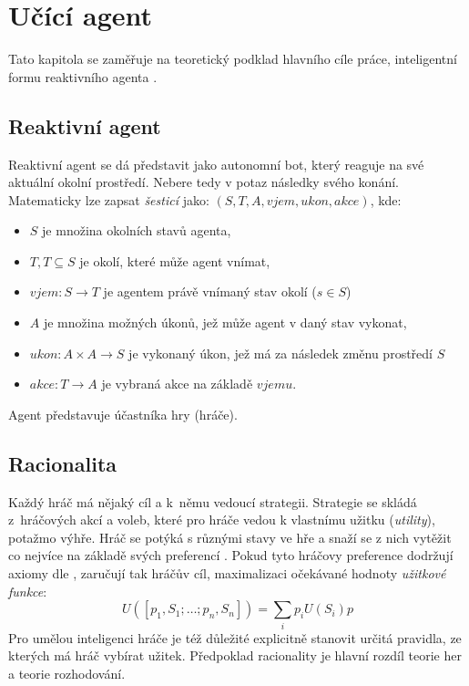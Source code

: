 \chapter{Učící agent}
Tato kapitola se zaměřuje na teoretický podklad hlavního cíle práce, inteligentní formu reaktivního agenta \cite{AI3}.
\section{Reaktivní agent}
Reaktivní agent \cite{AI3} se dá představit jako autonomní bot, který reaguje na své aktuální okolní prostředí. Nebere tedy v potaz následky svého konání. Matematicky lze zapsat \textit{šesticí} \cite{AI3} jako: $(S,T,A, vjem, ukon, akce)$, kde:
\begin{itemize}
\item $S$ je množina okolních stavů agenta,
\item $T, T\subseteq S$ je okolí, které může agent vnímat,
\item $vjem: S \to T$ je agentem právě vnímaný stav okolí ($s \in S$)
\item $A$ je množina možných úkonů, jež může agent v daný stav vykonat,
\item $ukon: A \times A \to S$ je vykonaný úkon, jež má za následek změnu prostředí $S$
\item $akce: T \to A$ je vybraná akce na základě $vjemu$.
\end{itemize}
Agent představuje účastníka hry (hráče).

\section{Racionalita}
\label{sec:racionalita}
Každý hráč má nějaký cíl a k němu vedoucí strategii. Strategie se skládá z hráčových akcí a voleb, které pro hráče vedou k vlastnímu užitku (\textit{utility}), potažmo výhře. Hráč se potýká s různými stavy ve hře a snaží se z nich vytěžit co nejvíce na základě svých preferencí \cite{berkeley}. Pokud tyto hráčovy preference dodržují axiomy dle \cite{mas}, zaručují tak hráčův cíl, maximalizaci očekávané hodnoty \textit{užitkové funkce}:
\begin{displaymath} 
U([p_1,S_1;\dots;p_n,S_n]) = \sum_{i}p_iU(S_i)p
\end{displaymath}
Pro umělou inteligenci hráče je též důležité explicitně stanovit určitá pravidla, ze kterých má hráč vybírat užitek. Předpoklad racionality je hlavní rozdíl teorie her a teorie rozhodování.

